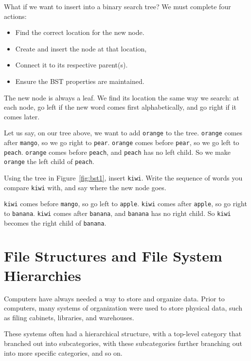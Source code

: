 What if we want to insert into a binary search tree? We must complete four actions:
\begin{itemize}
  \item Find the correct location for the new node.
  \item Create and insert the node at that location,
  \item Connect it to its respective parent(s).
  \item Ensure the BST properties are maintained.
\end{itemize}

The new node is always a leaf. We find its location the same way we search: at each node, go left if the new word comes first alphabetically, and go right if it comes later.

Let us say, on our tree above, we want to add \texttt{orange} to the tree. \texttt{orange} comes after \texttt{mango}, so we go right to \texttt{pear}. \texttt{orange} comes before \texttt{pear}, so we go left to \texttt{peach}. \texttt{orange} comes before \texttt{peach}, and \texttt{peach} has no left child. So we make \texttt{orange} the left child of \texttt{peach}.

\begin{Exercise}[title={Insert into a Search Tree}, label={ex:bst_insert}]
Using the tree in Figure~\ref{fig:bst1}, insert \texttt{kiwi}. Write the sequence of words you compare \texttt{kiwi} with, and say where the new node goes.
\end{Exercise}
\begin{Answer}[ref={ex:bst_insert}]
\texttt{kiwi} comes before \texttt{mango}, so go left to \texttt{apple}. \texttt{kiwi} comes after \texttt{apple}, so go right to \texttt{banana}. \texttt{kiwi} comes after \texttt{banana}, and \texttt{banana} has no right child. So \texttt{kiwi} becomes the right child of \texttt{banana}.
\end{Answer}

\section{File Structures and File System Hierarchies}
Computers have always needed a way to store and organize data. Prior to computers, many systems of organization were used to store physical data, such as filing cabinets, libraries, and warehouses.

These systems often had a hierarchical structure, with a top-level category that branched out into subcategories, with these subcategories further branching out into more specific categories, and so on.

